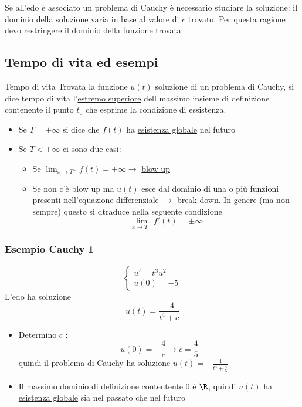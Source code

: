 Se all'edo è associato un problema di Cauchy è necessario studiare la soluzione: il dominio della soluzione varia in base al valore di $ c $ trovato. Per questa ragione devo restringere il dominio della funzione trovata.
\subsection{Tempo di vita ed esempi}
\begin{definizione}{Tempo di vita}
	Trovata la funzione $ u\left( t \right)  $ soluzione di un problema di Cauchy, si dice tempo di vita l'\underline{estremo superiore} dell massimo insieme di definizione contenente il punto $ t_0 $ che esprime la condizione di essistenza.
	\begin{itemize}
		\item Se $ T=+ \infty $ si dice che $ f\left( t \right)  $ ha \underline{esistenza globale} nel futuro
		\item Se $ T < +\infty $ ci sono due casi:
		      \begin{itemize}
			      \item Se $ \lim_{x \to T^{-}} f\left( t \right) = \pm \infty  \rightarrow$ \underline{blow up}
			      \item Se non c'è blow up ma $ u\left( t \right)  $ esce dal dominio di una o più funzioni presenti nell'equazione differenziale $ \rightarrow $ \underline{break down}. In genere (ma non sempre) questo si dtraduce nella seguente condizione
			            \[
				            \lim_{x \to T^{-}} f'\left( t \right) = \pm \infty
			            \]
		      \end{itemize}
	\end{itemize}

\end{definizione}

\subsubsection*{Esempio Cauchy 1}
\[
	\begin{cases}
		u' = t^3 u^2 \\
		u\left( 0 \right) = -5
	\end{cases}
\]
L'edo ha soluzione
\[
	u\left( t \right) = \frac{-4}{t ^{4}+ c}
\]
\begin{itemize}
	\item Determino $ c $ :
	      \[
		      u\left( 0 \right) = -\frac{4}{c} \rightarrow c = \frac{4}{5}
	      \]
	      quindi il problema di Cauchy ha soluzione $ u\left( t \right)= -\frac{4}{t ^{4}+ \frac{4}{5}} $
	\item Il massimo dominio di definizione contentente $ 0 $ è $ \R $, quindi $ u\left( t \right)  $ ha \underline{esistenza globale} sia nel passato che nel futuro
\end{itemize}
